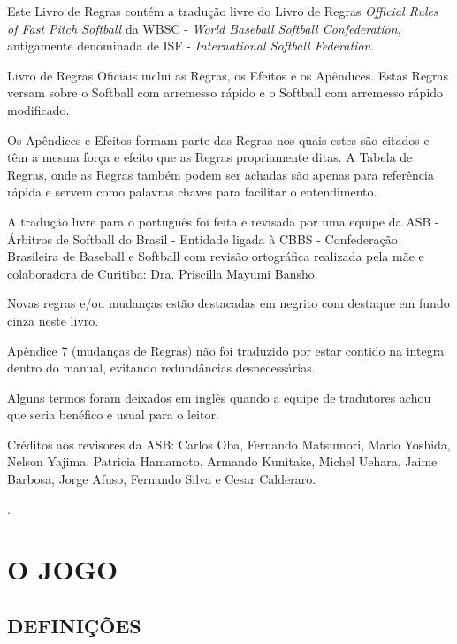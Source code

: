 \newpage
\vfill
\begin{center}
	\begin{minipage}{.80\textwidth}
		\setlength{\parskip}{3mm}
		Este Livro de Regras contém a tradução livre do Livro de Regras \textit{Official Rules  of Fast Pitch Softball} da WBSC - \textit{World Baseball Softball Confederation},  antigamente denominada de ISF - \textit{International Softball Federation}.

		Livro de Regras Oficiais inclui as Regras, os Efeitos e os Apêndices. Estas  Regras versam sobre o Softball com arremesso rápido e o Softball com arremesso rápido modificado.

		Os Apêndices e Efeitos formam parte das Regras nos quais estes são citados  e têm a mesma força e efeito que as Regras propriamente ditas. A Tabela de Regras, onde as Regras também podem ser achadas são apenas para  referência rápida e servem como palavras chaves para facilitar o entendimento.

		A tradução livre para o português foi feita e revisada por uma equipe da ASB - Árbitros de Softball do Brasil - Entidade ligada à CBBS - Confederação Brasileira  de Baseball e Softball com revisão ortográfica realizada pela mãe e colaboradora de Curitiba: Dra. Priscilla Mayumi Bansho.

		Novas regras e/ou mudanças estão destacadas em negrito com destaque em fundo cinza neste livro.

		Apêndice 7 (mudanças de Regras) não foi traduzido por estar contido na integra dentro do manual, evitando redundâncias desnecessárias.

		Alguns termos foram deixados em inglês quando a equipe de tradutores achou que seria benéfico e usual para o leitor.

		Créditos aos revisores da ASB: Carlos Oba, Fernando Matsumori, Mario Yoshida, Nelson Yajima, Patricia Hamamoto, Armando Kunitake, Michel Uehara, Jaime Barbosa, Jorge  Afuso, Fernando Silva e  Cesar  Calderaro.

	\end{minipage}
\end{center}
\vfill.

\chapter{O JOGO}

\minitoc%

\section{DEFINIÇÕES}

